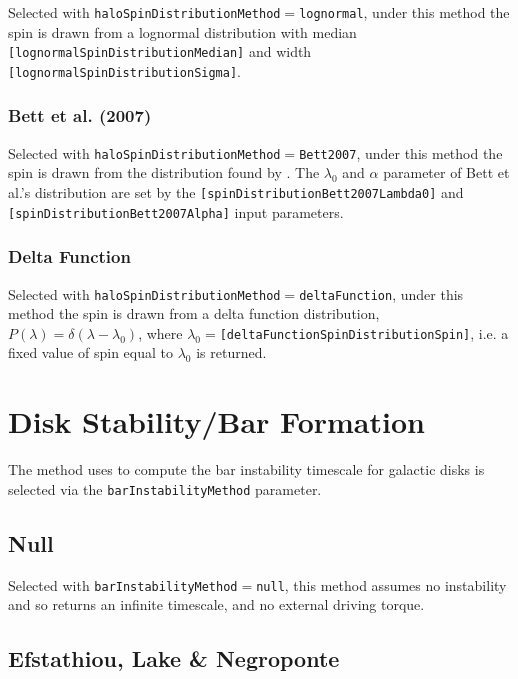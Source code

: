 Selected with {\tt haloSpinDistributionMethod}$=${\tt lognormal}, under this method the spin is drawn from a lognormal distribution with median {\tt [lognormalSpinDistributionMedian]} and width {\tt [lognormalSpinDistributionSigma]}.

\subsubsection{Bett et al. (2007)}

Selected with {\tt haloSpinDistributionMethod}$=${\tt Bett2007}, under this method the spin is drawn from the distribution found by \cite{bett_spin_2007}. The $\lambda_0$ and $\alpha$ parameter of Bett et al.'s distribution are set by the {\tt [spinDistributionBett2007Lambda0]} and {\tt [spinDistributionBett2007Alpha]} input parameters.

\subsubsection{Delta Function}

Selected with {\tt haloSpinDistributionMethod}$=${\tt deltaFunction}, under this method the spin is drawn from a delta function distribution, $P(\lambda) = \delta(\lambda-\lambda_0)$, where $\lambda_0=${\tt [deltaFunctionSpinDistributionSpin]}, i.e. a fixed value of spin equal to $\lambda_0$ is returned.

\section{Disk Stability/Bar Formation}\label{sec:DiskStability}

The method uses to compute the bar instability timescale for galactic disks is selected via the {\tt barInstabilityMethod} parameter.

\subsection{Null}

Selected with {\tt barInstabilityMethod}$=${\tt null}, this method assumes no instability and so returns an infinite timescale, and no external driving torque.

\subsection{Efstathiou, Lake \& Negroponte}

